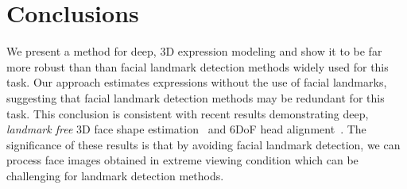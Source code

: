 \documentclass[a4paper, 10pt, conference]{ieeeconf}
\begin{document}
\section{Conclusions}\label{sec:conclu}
We present a method for deep, 3D expression modeling and show it to be far more robust than than facial landmark detection methods widely used for this task. Our approach estimates expressions without the use of facial landmarks, suggesting that facial landmark detection methods may be redundant for this task. This conclusion is consistent with recent results demonstrating deep, {\em landmark free} 3D face shape estimation~\cite{chang17fpn} and 6DoF head alignment~\cite{tran16_3dmm_cnn}. The significance of these results is that by avoiding facial landmark detection, we can process face images obtained in extreme viewing condition which can be challenging for landmark detection methods.

%
\end{document}
